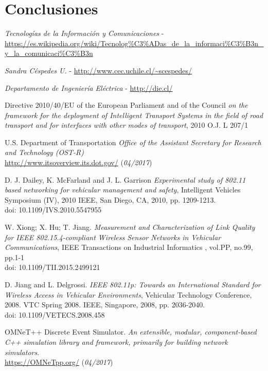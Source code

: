 \documentclass[11pt,letterpaper]{article}
\begin{document}
\newpage
\section{Conclusiones}
\newpage
\begin{thebibliography}{5}
     \emph{Tecnologías de la Información y Comunicaciones} - \url{https://es.wikipedia.org/wiki/Tecnolog%C3%ADas_de_la_informaci%C3%B3n_y_la_comunicaci%C3%B3n}

     \emph{Sandra Céspedes U.} - \url{http://www.cec.uchile.cl/~scespedes/}

     \emph{Departamento de Ingeniería Eléctrica} - \url{http://die.cl/}

  		 Directive 2010/40/EU of the European Parliament and of the Council
  		\textit{on the framework for the deployment of Intelligent Transport Systems in the field of road transport and for interfaces with other modes of transport},
  		2010 O.J. L 207/1

  		 U.S. Department of Transportation
  		\textit{Office of the Assistant Secretary for Research and Technology (OST-R)}
  		\\\url{http://www.itsoverview.its.dot.gov/} (\textit{04/2017})

  		 D. J. Dailey, K. McFarland and J. L. Garrison
  		\textit{Experimental study of 802.11 based networking for vehicular management and safety},
  		Intelligent Vehicles Symposium (IV), 2010 IEEE, San Diego, CA, 2010, pp. 1209-1213.
  		\\doi: 10.1109/IVS.2010.5547955


  		 W. Xiong; X. Hu; T. Jiang.
  		\textit{Measurement and Characterization of Link Quality for IEEE 802.15.4-compliant Wireless Sensor Networks in Vehicular Communications},
  		IEEE Transactions on Industrial Informatics , vol.PP, no.99, pp.1-1
  		\\doi: 10.1109/TII.2015.2499121

  		 D. Jiang and L. Delgrossi.
  		\textit{IEEE 802.11p: Towards an International Standard for Wireless Access in Vehicular Environments}, Vehicular Technology Conference, 2008. VTC Spring 2008. IEEE, Singapore, 2008, pp. 2036-2040.
  		\\doi: 10.1109/VETECS.2008.458

  		 OMNeT++ Discrete Event Simulator.
  		\textit{An extensible, modular, component-based C++ simulation library and framework, primarily for building network simulators}.
  		\\\url{https://OMNeTpp.org/} (\textit{04/2017})


\end{thebibliography}
\end{document}
